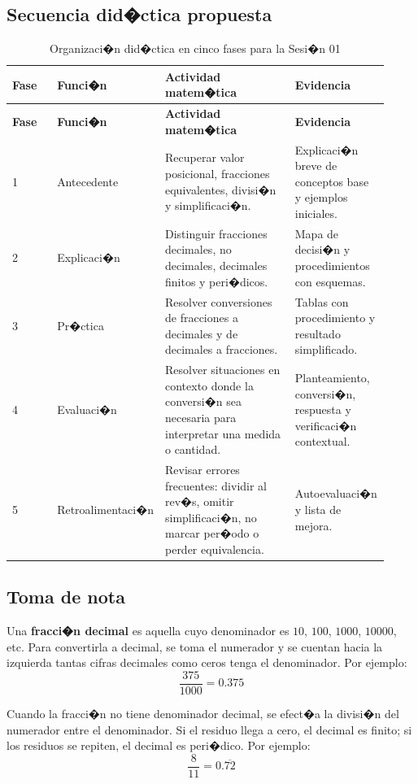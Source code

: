 \documentclass[
	spanish,
	letterpaper, oneside
]{article}
\begin{document}
\subsection{Secuencia did�ctica propuesta}

\begin{longtable}{@{}p{0.12\linewidth}p{0.20\linewidth}p{0.35\linewidth}p{0.25\linewidth}@{}}
	\caption{Organizaci�n did�ctica en cinco fases para la Sesi�n 01}\label{tab:fases-sesion01}\\
	\toprule
	\textbf{Fase} & \textbf{Funci�n} & \textbf{Actividad matem�tica} & \textbf{Evidencia} \\
	\midrule
	\endfirsthead
	\toprule
	\textbf{Fase} & \textbf{Funci�n} & \textbf{Actividad matem�tica} & \textbf{Evidencia} \\
	\midrule
	\endhead
	1 & Antecedente & Recuperar valor posicional, fracciones equivalentes, divisi�n y simplificaci�n. & Explicaci�n breve de conceptos base y ejemplos iniciales. \\
	2 & Explicaci�n & Distinguir fracciones decimales, no decimales, decimales finitos y peri�dicos. & Mapa de decisi�n y procedimientos con esquemas. \\
	3 & Pr�ctica & Resolver conversiones de fracciones a decimales y de decimales a fracciones. & Tablas con procedimiento y resultado simplificado. \\
	4 & Evaluaci�n & Resolver situaciones en contexto donde la conversi�n sea necesaria para interpretar una medida o cantidad. & Planteamiento, conversi�n, respuesta y verificaci�n contextual. \\
	5 & Retroalimentaci�n & Revisar errores frecuentes: dividir al rev�s, omitir simplificaci�n, no marcar per�odo o perder equivalencia. & Autoevaluaci�n y lista de mejora. \\
	\bottomrule
\end{longtable}

\subsection{Toma de nota}

Una \textbf{fracci�n decimal} es aquella cuyo denominador es $10$, $100$, $1000$, $10000$, etc. Para convertirla a decimal, se toma el numerador y se cuentan hacia la izquierda tantas cifras decimales como ceros tenga el denominador. Por ejemplo:
\[
	\frac{375}{1000}=0{.}375
\]

Cuando la fracci�n no tiene denominador decimal, se efect�a la divisi�n del numerador entre el denominador. Si el residuo llega a cero, el decimal es finito; si los residuos se repiten, el decimal es peri�dico. Por ejemplo:
\[
	\frac{8}{11}=0{.}\overline{72}
\]
\end{document}

